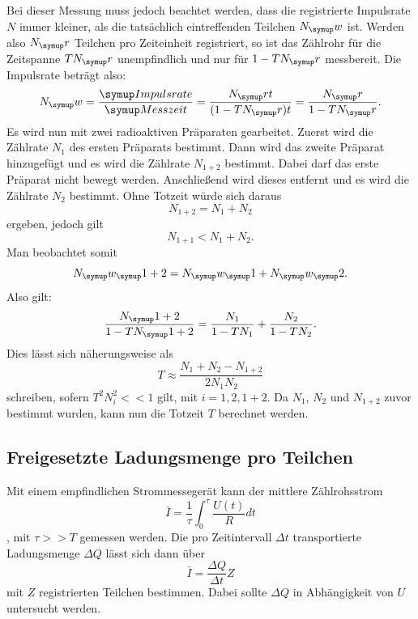 Bei dieser Messung muss jedoch beachtet werden, dass die registrierte Impulsrate $N$
immer kleiner, als die tatsächlich eintreffenden Teilchen $N_\su{w}$ ist.
Werden also $N_\su{r}$ Teilchen pro Zeiteinheit registriert, so ist das Zählrohr für
die Zeitspanne $TN_\su{r}$ unempfindlich und nur für $1-TN_\su{r}$ messbereit.
Die Impulsrate beträgt also:
\begin{equation}
  N_\su{w} = \frac{\su{Impulsrate}}{\su{Messzeit}} = \frac{N_\su{r}t}{(1-TN_\su{r})t} =
  \frac{N_\su{r}}{1-TN_\su{r}}.
\end{equation}
Es wird nun mit zwei radioaktiven Präparaten gearbeitet. Zuerst wird die
Zählrate $N_1$ des ersten Präparats bestimmt. Dann wird das zweite Präparat hinzugefügt
und es wird die Zählrate $N_{1+2}$ bestimmt. Dabei darf das erste Präparat nicht bewegt
werden. Anschließend wird dieses entfernt und es wird die Zählrate $N_2$
bestimmt. Ohne Totzeit würde sich daraus
\begin{equation}
  N_{1+2} = N_1 + N_2
\end{equation}
ergeben, jedoch gilt
\begin{equation}
  N_{1+1} < N_1 + N_2.
\end{equation}
Man beobachtet somit
\begin{equation}
  N_\su{w_\su{1+2}} = N_\su{w_\su{1}} + N_\su{w_\su{2}}.
\end{equation}
Also gilt:
\begin{equation}
  \frac{N_\su{1+2}}{1-TN_\su{1+2}} = \frac{N_1}{1-TN_1} + \frac{N_2}{1-TN_2}.
\end{equation}
Dies lässt sich näherungsweise als
\begin{equation}
  T \approx \frac{N_1 + N_2 - N_{1+2}}{2N_1 N_2}
  \label{eqn:tot}
\end{equation}
schreiben, sofern $T^2N_i^2 << 1$ gilt, mit $ i = 1, 2, 1+2$.
Da $N_1$, $N_2$ und $N_{1+2}$ zuvor bestimmt wurden, kann nun die Totzeit $T$
berechnet werden.

\subsection{Freigesetzte Ladungsmenge pro Teilchen}
Mit einem empfindlichen Strommessegerät kann der mittlere Zählrohsstrom
\begin{equation}
  \bar{I} = \frac{1}{\tau} \int_0^{\tau} \frac{U(t)}{R}dt
\end{equation}
, mit $\tau >> T$ gemessen werden.
Die pro Zeitintervall $\Delta t$ transportierte Ladungsmenge $\Delta Q$
lässt sich dann über
\begin{equation}
  \bar{I} = \frac{\Delta Q} {\Delta t} Z
\end{equation}
mit $Z$ registrierten Teilchen bestimmen. Dabei sollte $\Delta Q$ in Abhängigkeit
von $U$ untersucht werden.

